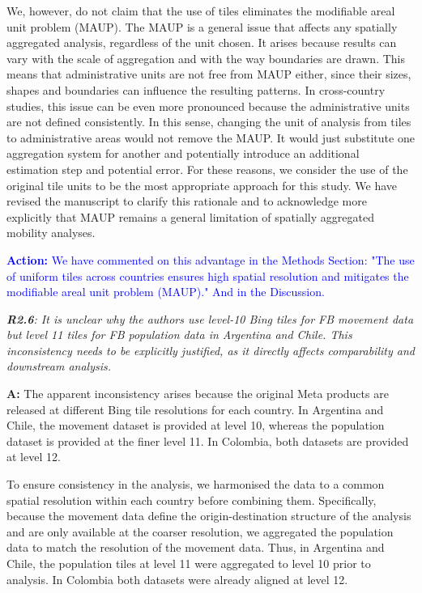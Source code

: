 \documentclass[12pt,a4paper,oneside, reqno]{amsart}
\begin{document}
We, however, do not claim that the use of tiles eliminates the modifiable areal unit problem (MAUP). The MAUP is a general issue that affects any spatially aggregated analysis, regardless of the unit chosen. It arises because results can vary with the scale of aggregation and with the way boundaries are drawn. This means that administrative units are not free from MAUP either, since their sizes, shapes and boundaries can influence the resulting patterns. In cross-country studies, this issue can be even more pronounced because the administrative units are not defined consistently. In this sense, changing the unit of analysis from tiles to administrative areas would not remove the MAUP. It would just substitute one aggregation system for another and potentially introduce an additional estimation step and potential error. For these reasons, we consider the use of the original tile units to be the most appropriate approach for this study. We have revised the manuscript to clarify this rationale and to acknowledge more explicitly that MAUP remains a general limitation of spatially aggregated mobility analyses.

\textcolor{blue}{\textbf{Action:} We have commented on this advantage in the Methods Section: "The use of uniform tiles across countries ensures high spatial resolution and mitigates the modifiable areal unit problem (MAUP)." And in the Discussion.}

\setlength{\leftskip}{0cm} \textit{\textbf{R2.6}: It is unclear why the authors use level-10 Bing tiles for FB movement data but level 11 tiles for FB population data in Argentina and Chile. This inconsistency needs to be explicitly justified, as it directly affects comparability and downstream analysis.}

\setlength{\leftskip}{1cm}\textbf{A:} The apparent inconsistency arises because the original Meta products are released at different Bing tile resolutions for each country. In Argentina and Chile, the movement dataset is provided at level 10, whereas the population dataset is provided at the finer level 11. In Colombia, both datasets are provided at level 12.

To ensure consistency in the analysis, we harmonised the data to a common spatial resolution within each country before combining them. Specifically, because the movement data define the origin-destination structure of the analysis and are only available at the coarser resolution, we aggregated the population data to match the resolution of the movement data. Thus, in Argentina and Chile, the population tiles at level 11 were aggregated to level 10 prior to analysis. In Colombia both datasets were already aligned at level 12.
\end{document}
